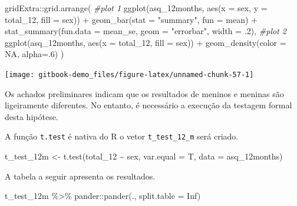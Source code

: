 \documentclass[
]{book}
\newenvironment{Shaded}{\begin{snugshade}}{\end{snugshade}}
\newcommand{\AttributeTok}[1]{\textcolor[rgb]{0.77,0.63,0.00}{#1}}
\newcommand{\CommentTok}[1]{\textcolor[rgb]{0.56,0.35,0.01}{\textit{#1}}}
\newcommand{\ConstantTok}[1]{\textcolor[rgb]{0.00,0.00,0.00}{#1}}
\newcommand{\DecValTok}[1]{\textcolor[rgb]{0.00,0.00,0.81}{#1}}
\newcommand{\FunctionTok}[1]{\textcolor[rgb]{0.00,0.00,0.00}{#1}}
\newcommand{\NormalTok}[1]{#1}
\newcommand{\OtherTok}[1]{\textcolor[rgb]{0.56,0.35,0.01}{#1}}
\newcommand{\SpecialCharTok}[1]{\textcolor[rgb]{0.00,0.00,0.00}{#1}}
\newcommand{\StringTok}[1]{\textcolor[rgb]{0.31,0.60,0.02}{#1}}
\begin{document}
\begin{Shaded}
\begin{Highlighting}[]
\NormalTok{gridExtra}\SpecialCharTok{::}\FunctionTok{grid.arrange}\NormalTok{(}
  \CommentTok{\#plot 1 }
  \FunctionTok{ggplot}\NormalTok{(asq\_12months, }\FunctionTok{aes}\NormalTok{(}\AttributeTok{x =}\NormalTok{ sex, }\AttributeTok{y =}\NormalTok{ total\_12, }\AttributeTok{fill =}\NormalTok{ sex)) }\SpecialCharTok{+}
    \FunctionTok{geom\_bar}\NormalTok{(}\AttributeTok{stat =} \StringTok{"summary"}\NormalTok{, }\AttributeTok{fun =}\NormalTok{ mean) }\SpecialCharTok{+}
    \FunctionTok{stat\_summary}\NormalTok{(}\AttributeTok{fun.data =}\NormalTok{ mean\_se, }\AttributeTok{geom =} \StringTok{"errorbar"}\NormalTok{, }
                 \AttributeTok{width =}\NormalTok{ .}\DecValTok{2}\NormalTok{),}
  \CommentTok{\#plot 2}
    \FunctionTok{ggplot}\NormalTok{(asq\_12months, }\FunctionTok{aes}\NormalTok{(}\AttributeTok{x =}\NormalTok{ total\_12, }\AttributeTok{fill =}\NormalTok{ sex)) }\SpecialCharTok{+} 
    \FunctionTok{geom\_density}\NormalTok{(}\AttributeTok{color =} \ConstantTok{NA}\NormalTok{, }\AttributeTok{alpha=}\NormalTok{.}\DecValTok{6}\NormalTok{)}
\NormalTok{)}
\end{Highlighting}
\end{Shaded}

\begin{center}\texttt{[image: gitbook-demo\_files/figure-latex/unnamed-chunk-57-1]} \end{center}

Os achados preliminares indicam que os resultados de meninos e meninas são ligeiramente diferentes. No entanto, é necessário a execução da testagem formal desta hipótese.

A função \texttt{t.test} é nativa do R o vetor \texttt{t\_test\_12\_m} será criado.

\begin{Shaded}
\begin{Highlighting}[]
\NormalTok{t\_test\_12m }\OtherTok{\textless{}{-}} \FunctionTok{t.test}\NormalTok{(total\_12 }\SpecialCharTok{\textasciitilde{}}\NormalTok{ sex, }\AttributeTok{var.equal =}\NormalTok{ T, }
                     \AttributeTok{data =}\NormalTok{ asq\_12months)}
\end{Highlighting}
\end{Shaded}

A tabela a seguir apresenta os resultados.

\begin{Shaded}
\begin{Highlighting}[]
\NormalTok{t\_test\_12m }\SpecialCharTok{\%\textgreater{}\%}\NormalTok{ pander}\SpecialCharTok{::}\FunctionTok{pander}\NormalTok{(., }\AttributeTok{split.table =} \ConstantTok{Inf}\NormalTok{)}
\end{Highlighting}
\end{Shaded}
\end{document}
